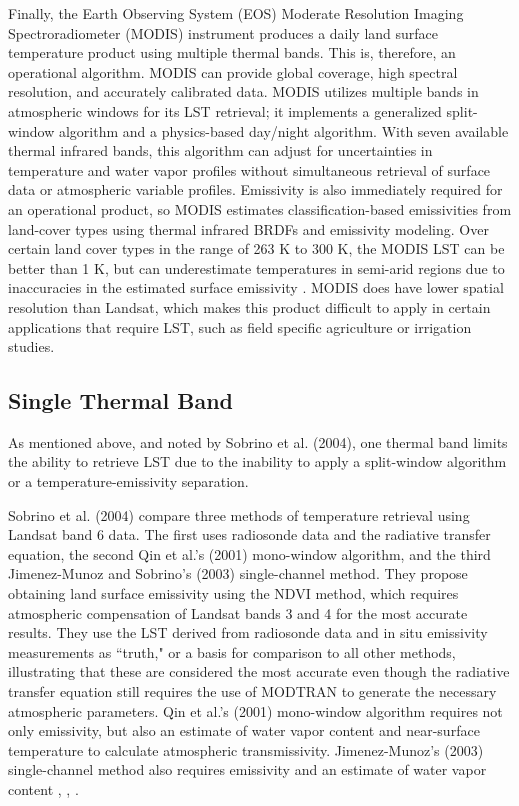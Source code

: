 \documentclass{book}
\begin{document}
Finally, the Earth Observing System (EOS) Moderate Resolution Imaging Spectroradiometer (MODIS) instrument produces a daily  land surface temperature product using multiple thermal bands.  This is, therefore, an operational algorithm.  MODIS can provide global coverage, high spectral resolution, and accurately calibrated data.  MODIS utilizes multiple bands in atmospheric windows for its LST retrieval; it implements a generalized split-window algorithm and a physics-based day/night algorithm.  With seven available thermal infrared bands, this algorithm can adjust for uncertainties in temperature and water vapor profiles without simultaneous retrieval of surface data or atmospheric variable profiles.  Emissivity is also immediately required for an operational product, so MODIS estimates classification-based emissivities from land-cover types using thermal infrared BRDFs and emissivity modeling.  Over certain land cover types in the range of 263 K to 300 K, the MODIS LST can be better than 1 K, but can underestimate temperatures in semi-arid regions due to inaccuracies in the estimated surface emissivity \cite{wan_2004}.  MODIS does have lower spatial resolution than Landsat, which makes this product difficult to apply in certain applications that require LST, such as field specific agriculture or irrigation studies.

\subsection{Single Thermal Band}
\label{sec:singlethermalband}

As mentioned above, and noted by Sobrino et al. (2004), one thermal band limits the ability to retrieve LST due to the inability to apply a split-window algorithm or a temperature-emissivity separation.

Sobrino et al. (2004) compare three methods of temperature retrieval using Landsat band 6 data.  The first uses radiosonde data and the radiative transfer equation, the second Qin et al.'s (2001) mono-window algorithm, and the third Jimenez-Munoz and Sobrino's (2003) single-channel method.  They propose obtaining land surface emissivity using the NDVI method, which requires atmospheric compensation of Landsat bands 3 and 4 for the most accurate results.  They use the LST derived from radiosonde data and in situ emissivity measurements as ``truth," or a basis for comparison to all other methods, illustrating that these are considered the most accurate even though the radiative transfer equation still requires the use of MODTRAN to generate the necessary atmospheric parameters.  Qin et al.'s (2001) mono-window algorithm requires not only emissivity, but also an estimate of water vapor content and near-surface temperature to calculate atmospheric transmissivity.  Jimenez-Munoz's (2003) single-channel method also requires emissivity and an estimate of water vapor content \cite{sobrino_2004}, \cite{jimenez-munoz_2003}, \cite{qin_2001}.
\end{document}
